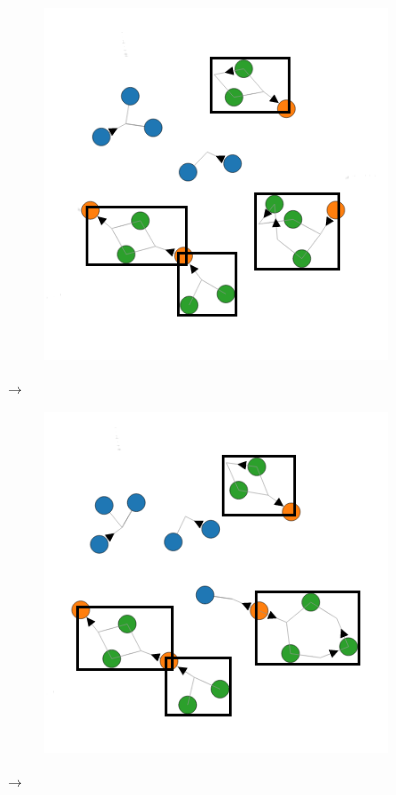     \begin{figure}[H]
        \centering
        \begin{subfigure}{0.4\linewidth}
            \includegraphics[width=\textwidth]{diagrams/all-diagrams-r2.png}
        \end{subfigure}
        $\longrightarrow$
        \begin{subfigure}{0.4\linewidth}
            \includegraphics[width=\textwidth]{diagrams/all-diagrams-r3.png}
        \end{subfigure}
        $\longrightarrow$
    \end{figure}
